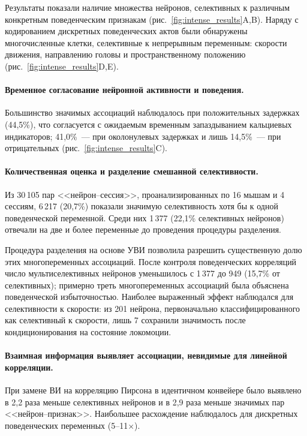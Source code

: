 Результаты показали наличие множества нейронов, селективных к различным конкретным поведенческим признакам (рис.~\ref{fig:intense_results}A,B). Наряду с кодированием дискретных поведенческих актов были обнаружены многочисленные клетки, селективные к непрерывным переменным: скорости движения, направлению головы и пространственному положению (рис.~\ref{fig:intense_results}D,E).

\paragraph{Временное согласование нейронной активности и поведения.} Большинство значимых ассоциаций наблюдалось при положительных задержках (44{,}5\%), что согласуется с ожидаемым временным запаздыванием кальциевых индикаторов; 41{,}0\%~--- при околонулевых задержках и лишь 14{,}5\%~--- при отрицательных (рис.~\ref{fig:intense_results}C).

\paragraph{Количественная оценка и разделение смешанной селективности.} Из 30\,105 пар <<нейрон--сессия>>, проанализированных по 16 мышам и 4 сессиям, 6\,217 (20{,}7\%) показали значимую селективность хотя бы к одной поведенческой переменной. Среди них 1\,377 (22{,}1\% селективных нейронов) отвечали на две и более переменные до проведения процедуры разделения.

Процедура разделения на основе УВИ позволила разрешить существенную долю этих многопеременных ассоциаций. После контроля поведенческих корреляций число мультиселективных нейронов уменьшилось с 1\,377 до 949 (15{,}7\% от селективных); примерно треть многопеременных ассоциаций была объяснена поведенческой избыточностью. Наиболее выраженный эффект наблюдался для селективности к скорости: из 201 нейрона, первоначально классифицированного как селективный к скорости, лишь 7 сохранили значимость после кондиционирования на состояние локомоции.

\paragraph{Взаимная информация выявляет ассоциации, невидимые для линейной корреляции.} При замене ВИ на корреляцию Пирсона в идентичном конвейере было выявлено в 2{,}2 раза меньше селективных нейронов и в 2{,}9 раза меньше значимых пар <<нейрон--признак>>. Наибольшее расхождение наблюдалось для дискретных поведенческих переменных (5--11$\times$).

